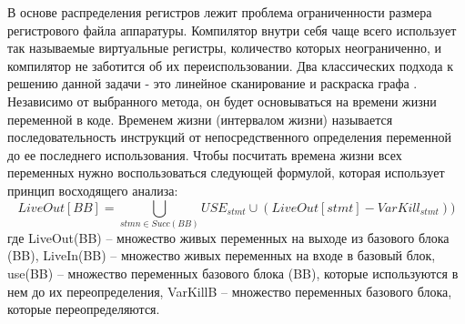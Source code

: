 В основе распределения регистров лежит проблема  ограниченности размера регистрового файла аппаратуры. Компилятор внутри себя чаще всего использует так называемые виртуальные регистры, количество которых неограниченно, и компилятор не заботится об их переиспользовании. Два классических подхода к решению данной задачи - это линейное сканирование \cite{poletto1999linear, subha2009modified} и раскраска графа \cite{smith2004generalized, briggs1992register}. 
Независимо от выбранного метода, он будет основываться на времени жизни переменной в коде. Временем жизни (интервалом жизни) называется последовательность инструкций от непосредственного определения переменной до ее последнего использования. Чтобы посчитать времена жизни всех переменных нужно воспользоваться следующей формулой, которая использует принцип восходящего анализа:
\begin{equation}
	LiveOut[BB] = \bigcup_{stmn \in Succ(BB)}{USE_{stmt} \cup (LiveOut[stmt] - VarKill_{stmt}))}
\end{equation}
где LiveOut(BB) – множество живых переменных на выходе из базового блока (BB),
LiveIn(BB) – множество живых переменных  на входе в базовый блок,
use(BB) – множество переменных базового блока (BB), которые используются
в нем до их переопределения,
VarKillB – множество переменных базового блока, которые
переопределяются.


